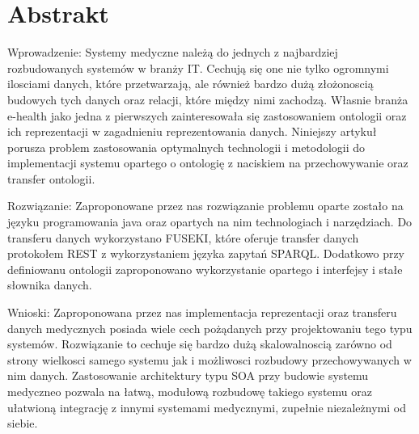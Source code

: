 \section{Abstrakt}
\label{sec:Abstrakt}

Wprowadzenie: Systemy medyczne należą do jednych z najbardziej rozbudowanych systemów w branży IT. Cechują się one nie tylko ogromnymi ilosciami danych, które przetwarzają, ale również bardzo dużą złożonoscią budowych tych danych oraz relacji, które między nimi zachodzą. Własnie branża e-health jako jedna z pierwszych zainteresowała się zastosowaniem ontologii oraz ich reprezentacji w zagadnieniu reprezentowania danych. Niniejszy artykuł porusza problem zastosowania optymalnych technologii i metodologii do implementacji systemu opartego o ontologię z naciskiem na przechowywanie oraz transfer ontologii.

Rozwiązanie: Zaproponowane przez nas rozwiązanie problemu oparte zostało na języku programowania java oraz opartych na nim technologiach i narzędziach. Do transferu danych wykorzystano FUSEKI, które oferuje transfer danych protokołem REST z wykorzystaniem języka zapytań SPARQL. Dodatkowo przy definiowanu ontologii zaproponowano wykorzystanie opartego i interfejsy i stałe słownika danych.

Wnioski: Zaproponowana przez nas implementacja reprezentacji oraz transferu danych medycznych posiada wiele cech pożądanych przy projektowaniu tego typu systemów. Rozwiązanie to cechuje się bardzo dużą skalowalnoscią zarówno od strony wielkosci samego systemu jak i możliwosci rozbudowy przechowywanych w nim danych. Zastosowanie architektury typu SOA przy budowie systemu medyczneo pozwala na łatwą, modułową rozbudowę takiego systemu oraz ułatwioną integrację z innymi systemami medycznymi, zupełnie niezależnymi od siebie.

